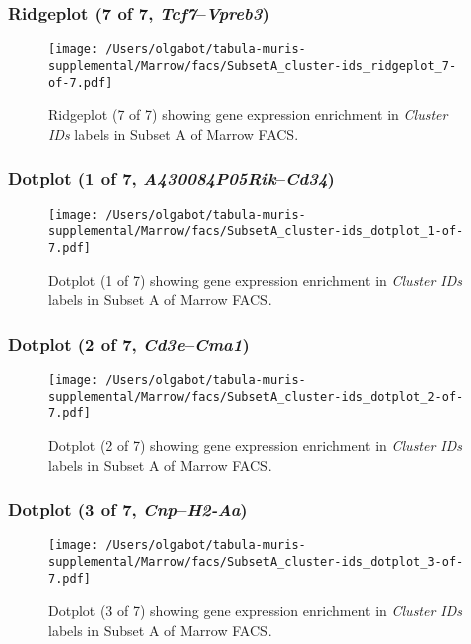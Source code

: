 \clearpage

\subsubsection{Ridgeplot (7 of 7, \emph{Tcf7}--\emph{Vpreb3})}
\begin{figure}[h]
\centering
\texttt{[image: /Users/olgabot/tabula-muris-supplemental/Marrow/facs/SubsetA\_cluster-ids\_ridgeplot\_7-of-7.pdf]}

\caption{ Ridgeplot (7 of 7)  showing gene expression enrichment in \emph{Cluster IDs} labels in Subset A of Marrow FACS. }
\end{figure}


\clearpage

\subsubsection{Dotplot (1 of 7, \emph{A430084P05Rik}--\emph{Cd34})}
\begin{figure}[h]
\centering
\texttt{[image: /Users/olgabot/tabula-muris-supplemental/Marrow/facs/SubsetA\_cluster-ids\_dotplot\_1-of-7.pdf]}

\caption{ Dotplot (1 of 7)  showing gene expression enrichment in \emph{Cluster IDs} labels in Subset A of Marrow FACS. }
\end{figure}


\clearpage

\subsubsection{Dotplot (2 of 7, \emph{Cd3e}--\emph{Cma1})}
\begin{figure}[h]
\centering
\texttt{[image: /Users/olgabot/tabula-muris-supplemental/Marrow/facs/SubsetA\_cluster-ids\_dotplot\_2-of-7.pdf]}

\caption{ Dotplot (2 of 7)  showing gene expression enrichment in \emph{Cluster IDs} labels in Subset A of Marrow FACS. }
\end{figure}


\clearpage

\subsubsection{Dotplot (3 of 7, \emph{Cnp}--\emph{H2-Aa})}
\begin{figure}[h]
\centering
\texttt{[image: /Users/olgabot/tabula-muris-supplemental/Marrow/facs/SubsetA\_cluster-ids\_dotplot\_3-of-7.pdf]}

\caption{ Dotplot (3 of 7)  showing gene expression enrichment in \emph{Cluster IDs} labels in Subset A of Marrow FACS. }
\end{figure}


